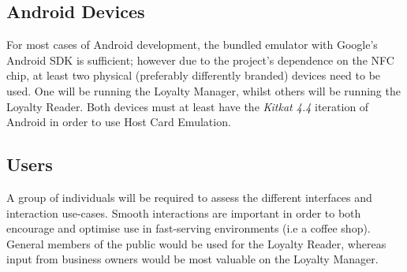 \subsection{Android Devices}
For most cases of Android development, the bundled emulator with Google's Android SDK is sufficient; however due to the project's dependence on the NFC chip, at least two physical (preferably differently branded) devices need to be used. One will be running the Loyalty Manager, whilst others will be running the Loyalty Reader. Both devices must at least have the \emph{Kitkat 4.4} iteration of Android in order to use Host Card Emulation.
\subsection{Users}
A group of individuals will be required to assess the different interfaces and interaction use-cases. Smooth interactions are important in order to both encourage and optimise use in fast-serving environments (i.e a coffee shop). General members of the public would be used for the Loyalty Reader, whereas input from business owners would be most valuable on the Loyalty Manager. 
